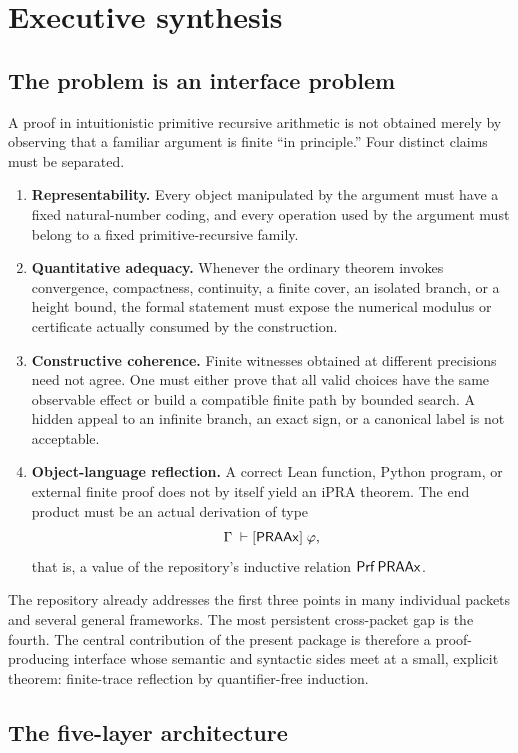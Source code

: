 \section{Executive synthesis}

\subsection{The problem is an interface problem}

A proof in intuitionistic primitive recursive arithmetic is not obtained merely by observing that a familiar argument is finite ``in principle.'' Four distinct claims must be separated.

\begin{enumerate}
\item \textbf{Representability.} Every object manipulated by the argument must have a fixed natural-number coding, and every operation used by the argument must belong to a fixed primitive-recursive family.
\item \textbf{Quantitative adequacy.} Whenever the ordinary theorem invokes convergence, compactness, continuity, a finite cover, an isolated branch, or a height bound, the formal statement must expose the numerical modulus or certificate actually consumed by the construction.
\item \textbf{Constructive coherence.} Finite witnesses obtained at different precisions need not agree. One must either prove that all valid choices have the same observable effect or build a compatible finite path by bounded search. A hidden appeal to an infinite branch, an exact sign, or a canonical label is not acceptable.
\item \textbf{Object-language reflection.} A correct Lean function, Python program, or external finite proof does not by itself yield an iPRA theorem. The end product must be an actual derivation of type
\[
   \Gamma \;\vdash[\mathsf{PRAAx}]\; \varphi,
\]
that is, a value of the repository's inductive relation \(\mathsf{Prf}\,\mathsf{PRAAx}\).
\end{enumerate}

The repository already addresses the first three points in many individual packets and several general frameworks. The most persistent cross-packet gap is the fourth. The central contribution of the present package is therefore a proof-producing interface whose semantic and syntactic sides meet at a small, explicit theorem: finite-trace reflection by quantifier-free induction.

\subsection{The five-layer architecture}

